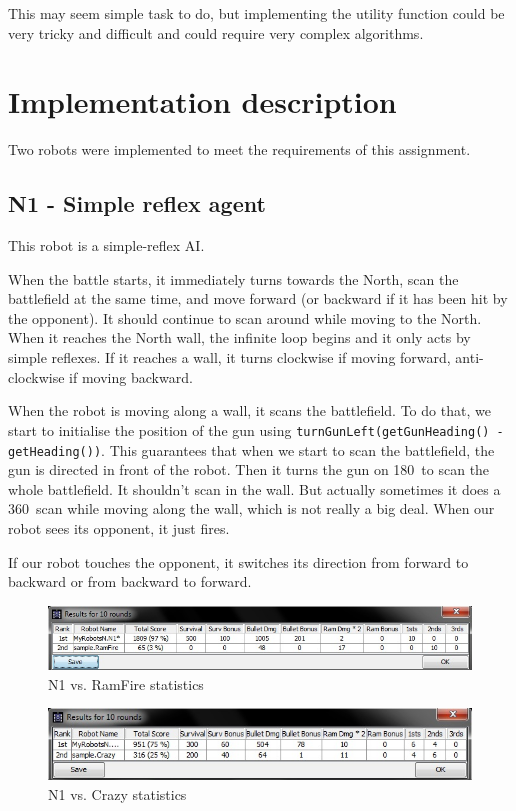 \documentclass{article}
\begin{document}
This may seem simple task to do, but implementing the utility function could be
very tricky and difficult and could require very complex algorithms.

\section{Implementation description}

Two robots were implemented to meet the requirements of this assignment.

\subsection{N1 - Simple reflex agent}

This robot is a simple-reflex AI.

When the battle starts, it immediately turns towards the North, scan the
battlefield at the same time, and move forward (or backward if it has been hit
by the opponent). It should continue to scan around while moving to the North.
When it reaches the North wall, the infinite loop begins and it only acts by
simple reflexes. If it reaches a wall, it turns clockwise if moving forward,
anti-clockwise if moving backward.

When the robot is moving along a wall, it scans the battlefield. To do that, we
start to initialise the position of the gun using \texttt{turnGunLeft(getGunHeading() -
getHeading())}. This guarantees that when we start to scan the battlefield, the
gun is directed in front of the robot. Then it turns the gun on 180\degree~to scan the
whole battlefield. It shouldn’t scan in the wall. But actually sometimes it does
a 360\degree~scan while moving along the wall, which is not really a big deal.
When our robot sees its opponent, it just fires.

If our robot touches the opponent, it switches its direction from forward to
backward or from backward to forward.

\begin{figure}[h!]
  \caption{N1 vs. RamFire statistics}
  \centering
    \includegraphics[width=\textwidth]{n1-ramfire.jpg}
\end{figure}

\begin{figure}[h!]
  \caption{N1 vs. Crazy statistics}
  \centering
    \includegraphics[width=\textwidth]{n1-crazy.jpg}
\end{figure}
\end{document}
